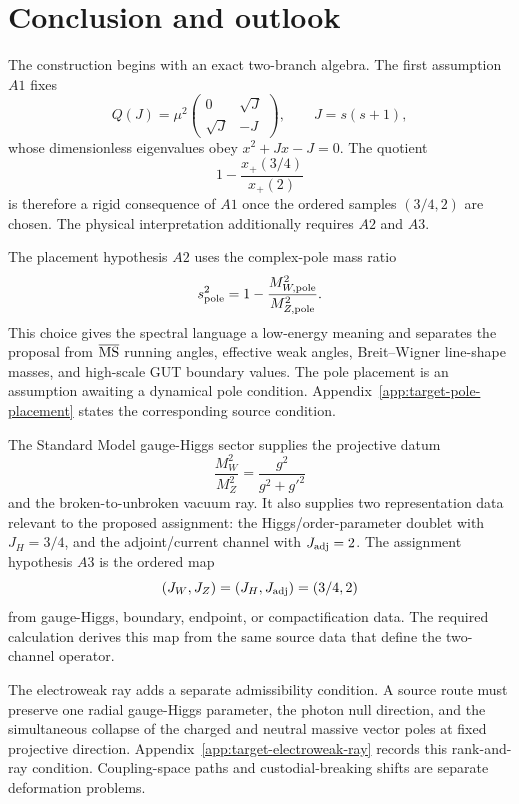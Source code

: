 \section{Conclusion and outlook}
\label{sec:status-tests}

The construction begins with an exact two-branch algebra.  The first
assumption \(A1\) fixes
\[
  Q(J)=\mu^2
  \begin{pmatrix}
  0&\sqrt J\\
  \sqrt J&-J
  \end{pmatrix},
  \qquad
  J=s(s+1),
\]
whose dimensionless eigenvalues obey \(x^2+Jx-J=0\).  The quotient
\[
  1-\frac{x_+(3/4)}{x_+(2)}
\]
is therefore a rigid consequence of \(A1\) once the ordered samples
\((3/4,2)\) are chosen.  The physical interpretation additionally requires
\(A2\) and \(A3\).

The placement hypothesis \(A2\) uses the complex-pole mass ratio
\[
  s^2_{\rm pole}=1-\frac{M_{W,\rm pole}^2}{M_{Z,\rm pole}^2}.
\]
This choice gives the spectral language a low-energy meaning and separates the
proposal from \(\overline{\mathrm{MS}}\) running angles, effective weak angles, Breit--Wigner
line-shape masses, and high-scale GUT boundary values.  The pole placement is
an assumption awaiting a dynamical pole condition.  Appendix~\ref{app:target-pole-placement}
states the corresponding source condition.

The Standard Model gauge-Higgs sector supplies the projective datum
\[
  \frac{M_W^2}{M_Z^2}=\frac{g^2}{g^2+g'^2}
\]
and the broken-to-unbroken vacuum ray.  It also supplies two representation
data relevant to the proposed assignment: the Higgs/order-parameter doublet
with \(J_H=3/4\), and the adjoint/current channel with \(J_{\rm adj}=2\).
The assignment hypothesis \(A3\) is the ordered map
\[
  (J_W,J_Z)=(J_H,J_{\rm adj})=(3/4,2)
\]
from gauge-Higgs, boundary, endpoint, or compactification data.  The required
calculation derives this map from the same source data that define the
two-channel operator.

The electroweak ray adds a separate admissibility condition.  A source route
must preserve one radial gauge-Higgs parameter, the photon null direction, and
the simultaneous collapse of the charged and neutral massive vector poles at
fixed projective direction.  Appendix~\ref{app:target-electroweak-ray} records
this rank-and-ray condition.  Coupling-space paths and custodial-breaking
shifts are separate deformation problems.

